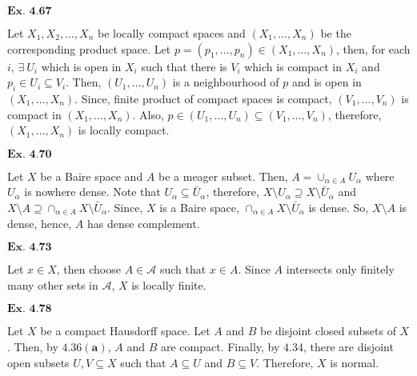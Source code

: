 \documentclass{article}
\begin{document}
\vspace{0.2in}



${\textbf{Ex. 4.67}}$

Let $X_1,X_2,\ldots,X_n$ be locally compact spaces and $(X_1, \ldots, X_n)$ be the corresponding product space. Let $p = (p_1,\ldots,p_n) \in (X_1, \ldots, X_n)$, then, for each $i$, $\exists\ U_i$ which is open in $X_i$ such that there is $V_i$ which is compact in $X_i$ and $p_i \in U_i \subseteq V_i$. Then, $(U_1,\ldots,U_n)$ is a neighbourhood of $p$ and is open in $(X_1, \ldots, X_n)$. Since, finite product of compact spaces is compact, $(V_1,\ldots,V_n)$ is compact in $(X_1,\ldots,X_n)$. Also, $p \in (U_1,\ldots,U_n) \subseteq (V_1,\ldots,V_n)$, therefore, $(X_1, \ldots, X_n)$ is locally compact.

\vspace{0.2in}

${\textbf{Ex. 4.70}}$

Let $X$ be a Baire space and $A$ be a meager subset. Then, $A = \cup_{\alpha \in A} U_{\alpha}$ where $U_\alpha$ is nowhere dense. Note that $U_{\alpha} \subseteq \bar{U}_{\alpha}$, therefore, $X \setminus U_{\alpha} \supseteq X\setminus \bar{U}_{\alpha}$ and $X \setminus A \supseteq \cap_{\alpha \in A}X\setminus \bar{U}_{\alpha}$. Since, $X$ is a Baire space, $\cap_{\alpha \in A}X\setminus \bar{U}_{\alpha}$ is dense. So, $X \setminus A$ is dense, hence, $A$ has dense complement.

\vspace{0.2in}

${\textbf{Ex. 4.73}}$


Let $x \in X$, then choose $A \in \mathcal{A}$ such that $x \in A$. Since $A$ intersects only finitely many other sets in $\mathcal{A}$, $X$ is locally finite. 

\vspace{0.2in}

${\textbf{Ex. 4.78}}$

Let $X$ be a compact Hausdorff space. Let $A$ and $B$ be disjoint closed subsets of $X$. Then, by $\mathbf{4.36(a)}$, $A$ and $B$ are compact. Finally, by $\mathbf{4.34}$, there are disjoint open subsets $U,V \subseteq X$ such that $A\subseteq U$ and $B \subseteq V$. Therefore, $X$ is normal.
\end{document}
